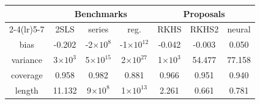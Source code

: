 \begin{tabular}{ccccccc}
    & \multicolumn{3}{c}{Benchmarks} & \multicolumn{3}{c}{Proposals} \tabularnewline
    \cmidrule(lr){2-4}\cmidrule(lr){5-7}
     & 2SLS & series & reg. & RKHS & RKHS2 & neural \tabularnewline
    \hline
    bias & -0.202 & -2$\times 10^{8}$ & -1$\times 10^{12}$ & -0.042 & -0.003 & 0.050 \tabularnewline
    variance & 3$\times 10^{3}$ & 5$\times 10^{15}$ & 2$\times 10^{27}$ & 1$\times 10^{3}$ & 54.477 & 77.158 \tabularnewline
    coverage & 0.958 & 0.982 & 0.881 & 0.966 & 0.951 & 0.940 \tabularnewline
    length & 11.132 & 9$\times 10^{8}$ & 1$\times 10^{13}$ & 2.261 & 0.661 & 0.781 \tabularnewline
    \hline
\end{tabular}
